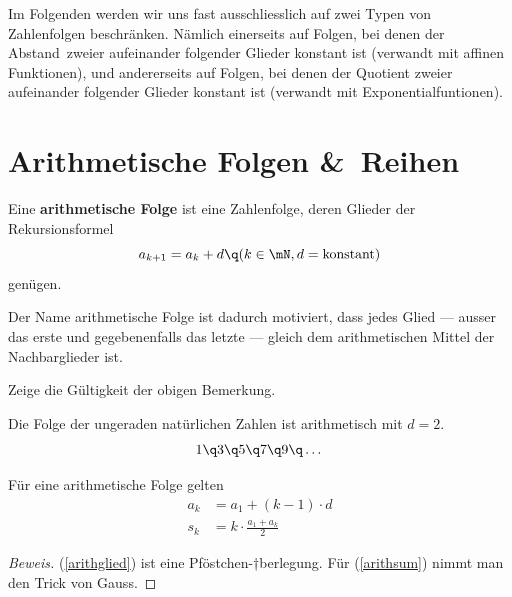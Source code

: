 \documentclass[%
11pt,%
twoside,%
titlepage,%
german,%
headsepline%
]{scrartcl}
\begin{document}
Im Folgenden werden wir uns fast ausschliesslich auf zwei Typen von Zahlenfolgen beschr\"anken. N\"amlich einerseits auf Folgen, bei denen der \glqq Abstand\grqq\ zweier aufeinander folgender Glieder konstant ist (verwandt mit affinen Funktionen), und andererseits auf Folgen, bei denen der Quotient zweier aufeinander folgender Glieder konstant ist (verwandt mit Exponentialfuntionen).

\section{Arithmetische Folgen \&\ Reihen}

\begin{cdef}{}
Eine
\textbf{arithmetische Folge} ist eine Zahlenfolge, deren Glieder der Rekursionsformel
$$a_{k+1}=a_k+d\q (k\in\mN, d=\text{konstant})$$
gen\"ugen.
\end{cdef}

\begin{bem}
Der Name arithmetische Folge ist dadurch motiviert, dass jedes Glied --- ausser das erste und gegebenenfalls das letzte --- gleich dem arithmetischen Mittel der Nachbarglieder ist.
\end{bem}

\begin{ueb}
Zeige die G\"ultigkeit der obigen Bemerkung.
\end{ueb}

\begin{bsp}
Die Folge der ungeraden nat\"urlichen Zahlen ist arithmetisch mit $d=2$.
$$1\q3\q5\q7\q9\q\dots$$
\end{bsp}

\pagebreak

\begin{csatz}[AF Formeln]{}\label{arithformeln}
F\"ur eine arithmetische Folge gelten
\begin{align}
a_k&=a_1+(k-1)\cdot d\label{arithglied}\\
s_k&=k\cdot\frac{a_1+a_k}{2}\label{arithsum}
\end{align}
\end{csatz}

\begin{proof}[Beweis]
(\ref{arithglied}) ist eine \glqq Pf\"ostchen-†berlegung\grqq. F\"ur (\ref{arithsum}) nimmt man den Trick von Gauss.
\end{proof}
\end{document}

